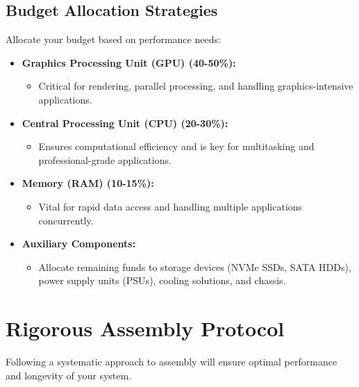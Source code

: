\documentclass{article}
\begin{document}
\subsection{Budget Allocation Strategies}
Allocate your budget based on performance needs:
\begin{itemize}[itemsep=5pt]
    \item \textbf{Graphics Processing Unit (GPU) (40-50\%):} 
    \begin{itemize}[label=--]
        \item Critical for rendering, parallel processing, and handling graphics-intensive applications.
    \end{itemize}
    \item \textbf{Central Processing Unit (CPU) (20-30\%):} 
    \begin{itemize}[label=--]
        \item Ensures computational efficiency and is key for multitasking and professional-grade applications.
    \end{itemize}
    \item \textbf{Memory (RAM) (10-15\%):}
    \begin{itemize}[label=--]
        \item Vital for rapid data access and handling multiple applications concurrently.
    \end{itemize}
    \item \textbf{Auxiliary Components:} 
    \begin{itemize}[label=--]
        \item Allocate remaining funds to storage devices (NVMe SSDs, SATA HDDs), power supply units (PSUs), cooling solutions, and chassis.
    \end{itemize}
\end{itemize}

\section{Rigorous Assembly Protocol}
Following a systematic approach to assembly will ensure optimal performance and longevity of your system.
\end{document}
